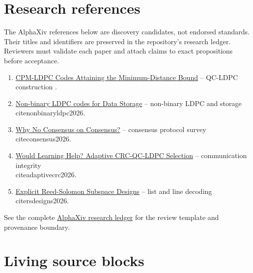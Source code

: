 \documentclass[11pt,oneside]{article}
\begin{document}
\section*{Research references}
The AlphaXiv references below are discovery candidates, not endorsed standards. Their titles and identifiers are preserved in the repository's research ledger. Reviewers must validate each paper and attach claims to exact propositions before acceptance.
\begin{enumerate}
\item \href{https://www.alphaxiv.org/abs/2609.16836}{CPM-LDPC Codes Attaining the Minimum-Distance Bound} -- QC-LDPC construction \cite{cpmldpc2026}.
\item \href{https://www.alphaxiv.org/abs/2605.08500}{Non-binary LDPC codes for Data Storage} -- non-binary LDPC and storage \\cite{nonbinaryldpc2026}.
\item \href{https://www.alphaxiv.org/abs/2603.08629}{Why No Consensus on Consensus?} -- consensus protocol survey \\cite{consensus2026}.
\item \href{https://www.alphaxiv.org/abs/2604.04277}{Would Learning Help? Adaptive CRC-QC-LDPC Selection} -- communication integrity \\cite{adaptivecrc2026}.
\item \href{https://www.alphaxiv.org/abs/2610.36215}{Explicit Reed-Solomon Subspace Designs} -- list and line decoding \\cite{rsdesigns2026}.
\end{enumerate}
See the complete \href{https://github.com/NexusCryptic/Welcome-Sentience/blob/main/research/ALPHAXIV_RESEARCH_LEDGER.md}{AlphaXiv research ledger} for the review template and provenance boundary.
\nocite{*}


\section*{Living source blocks}

\clearpage{}\printindex
\end{document}
